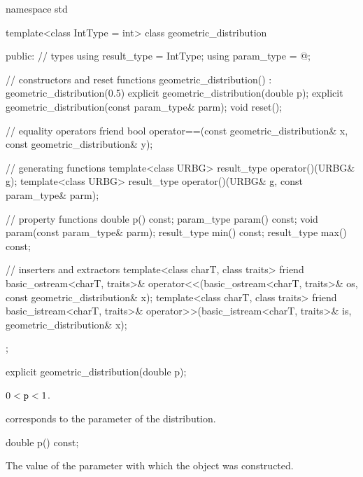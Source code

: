 %
%
\begin{codeblock}
namespace std {
  template<class IntType = int>
  class geometric_distribution {
  public:
    // types
    using result_type = IntType;
    using param_type  = @\unspec@;

    // constructors and reset functions
    geometric_distribution() : geometric_distribution(0.5) {}
    explicit geometric_distribution(double p);
    explicit geometric_distribution(const param_type& parm);
    void reset();

    // equality operators
    friend bool operator==(const geometric_distribution& x, const geometric_distribution& y);

    // generating functions
    template<class URBG>
      result_type operator()(URBG& g);
    template<class URBG>
      result_type operator()(URBG& g, const param_type& parm);

    // property functions
    double p() const;
    param_type param() const;
    void param(const param_type& parm);
    result_type min() const;
    result_type max() const;

    // inserters and extractors
    template<class charT, class traits>
      friend basic_ostream<charT, traits>&
        operator<<(basic_ostream<charT, traits>& os, const geometric_distribution& x);
    template<class charT, class traits>
      friend basic_istream<charT, traits>&
        operator>>(basic_istream<charT, traits>& is, geometric_distribution& x);
  };
}
\end{codeblock}


%
\begin{itemdecl}
explicit geometric_distribution(double p);
\end{itemdecl}

\begin{itemdescr}
\pnum
\expects
$0 < \tcode{p} < 1$.

\pnum
\remarks
 corresponds to the parameter of the distribution.
\end{itemdescr}

%
\begin{itemdecl}
double p() const;
\end{itemdecl}

\begin{itemdescr}
\pnum
\returns
The value of the  parameter
 with which the object was constructed.
\end{itemdescr}

